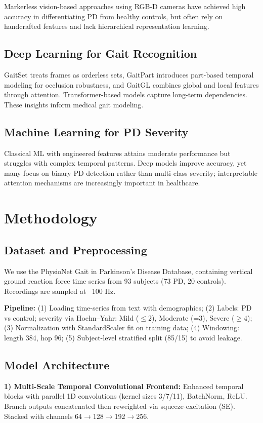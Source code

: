 \documentclass[conference]{IEEEtran}
\begin{document}
Markerless vision-based approaches using RGB-D cameras have achieved high accuracy in differentiating PD from healthy controls, but often rely on handcrafted features and lack hierarchical representation learning.

\subsection{Deep Learning for Gait Recognition}
GaitSet treats frames as orderless sets, GaitPart introduces part-based temporal modeling for occlusion robustness, and GaitGL combines global and local features through attention. Transformer-based models capture long-term dependencies. These insights inform medical gait modeling.

\subsection{Machine Learning for PD Severity}
Classical ML with engineered features attains moderate performance but struggles with complex temporal patterns. Deep models improve accuracy, yet many focus on binary PD detection rather than multi-class severity; interpretable attention mechanisms are increasingly important in healthcare.

\section{Methodology}
\subsection{Dataset and Preprocessing}
We use the PhysioNet Gait in Parkinson's Disease Database, containing vertical ground reaction force time series from 93 subjects (73 PD, 20 controls). Recordings are sampled at ~100 Hz.

\textbf{Pipeline:} (1) Loading time-series from text with demographics; (2) Labels: PD vs control; severity via Hoehn--Yahr: Mild (\(\leq 2\)), Moderate (=3), Severe (\(\geq 4\)); (3) Normalization with StandardScaler fit on training data; (4) Windowing: length 384, hop 96; (5) Subject-level stratified split (85/15) to avoid leakage.

\subsection{Model Architecture}
\textbf{1) Multi-Scale Temporal Convolutional Frontend:} Enhanced temporal blocks with parallel 1D convolutions (kernel sizes 3/7/11), BatchNorm, ReLU. Branch outputs concatenated then reweighted via squeeze-excitation (SE). Stacked with channels 64$\rightarrow$128$\rightarrow$192$\rightarrow$256.
\end{document}
